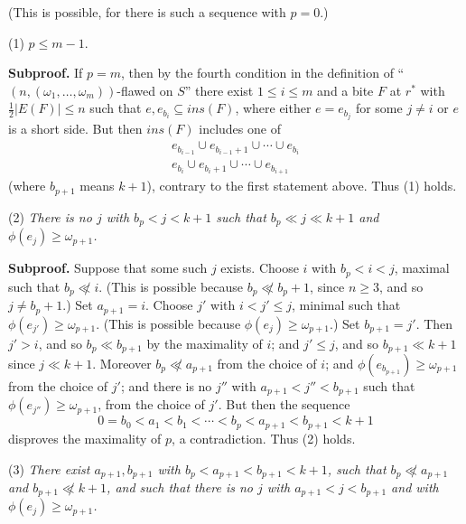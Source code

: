 \noindent (This is possible, for there is such a sequence with $p = 0$.)

\hspace*{12pt}(1) $p \le m - 1$.

\textbf{Subproof.} If $p = m$, then by the fourth condition in the definition of ``$(n, (\omega_1, \dots, \omega_m))$-flawed on $S$'' there exist $1 \le i \le m$ and a bite $F$ at $r^*$ with $\frac{1}{2}|E(F)| \le n$ such that $e, e_{b_i} \subseteq ins(F)$, where either $e = e_{b_j}$ for some $j \ne i$ or $e$ is a short side. But then $ins(F)$ includes one of
\begin{align*}
e_{b_{i-1}} \cup e_{b_{i-1}+1} \cup \cdots \cup e_{b_i} \\
e_{b_i} \cup e_{b_i+1} \cup \cdots \cup e_{b_{i+1}}
\end{align*}
(where $b_{p+1}$ means $k + 1$), contrary to the first statement above. Thus (1) holds.

\hspace*{12pt}(2) \textit{There is no $j$ with $b_p < j < k + 1$ such that $b_p \ll j \ll k + 1$ and $\phi(e_j) \ge \omega_{p+1}$.}

\textbf{Subproof.} Suppose that some such $j$ exists. Choose $i$ with $b_p < i < j$, maximal such that $b_p \not\ll i$. (This is possible because $b_p \not\ll b_p + 1$, since $n \ge 3$, and so $j \ne b_p + 1$.) Set $a_{p+1} = i$. Choose $j'$ with $i < j' \le j$, minimal such that $\phi(e_{j'}) \ge \omega_{p+1}$. (This is possible because $\phi(e_j) \ge \omega_{p+1}$.) Set $b_{p+1} = j'$. Then $j' > i$, and so $b_p \ll b_{p+1}$ by the maximality of $i$; and $j' \le j$, and so $b_{p+1} \ll k + 1$ since $j \ll k + 1$. Moreover $b_p \not\ll a_{p+1}$ from the choice of $i$; and $\phi(e_{b_{p+1}}) \ge \omega_{p+1}$ from the choice of $j'$; and there is no $j''$ with $a_{p+1} < j'' < b_{p+1}$ such that $\phi(e_{j''}) \ge \omega_{p+1}$, from the choice of $j'$. But then the sequence
\begin{equation*}
0 = b_0 < a_1 < b_1 < \cdots < b_p < a_{p+1} < b_{p+1} < k + 1
\end{equation*}
disproves the maximality of $p$, a contradiction. Thus (2) holds.

\hspace*{12pt}(3) \textit{There exist $a_{p+1}, b_{p+1}$ with $b_p < a_{p+1} < b_{p+1} < k + 1$, such that $b_p \not\ll a_{p+1}$ and $b_{p+1} \not\ll k + 1$, and such that there is no $j$ with $a_{p+1} < j < b_{p+1}$ and with $\phi(e_j) \ge \omega_{p+1}$.}

